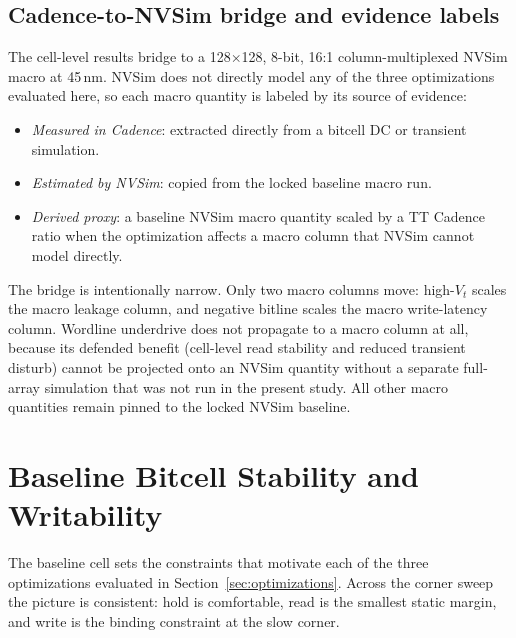 \documentclass[pdflatex,sn-mathphys-num]{sn-jnl}%
\theoremstyle{thmstyleone}%
\theoremstyle{thmstyletwo}%
\theoremstyle{thmstylethree}%
\begin{document}
\subsection{Cadence-to-NVSim bridge and evidence labels}\label{sec:setup-bridge}

The cell-level results bridge to a 128$\times$128, 8-bit, 16:1 column-multiplexed NVSim macro at 45\,nm. NVSim does not directly model any of the three optimizations evaluated here, so each macro quantity is labeled by its source of evidence:

\begin{itemize}
\item \emph{Measured in Cadence}: extracted directly from a bitcell DC or transient simulation.
\item \emph{Estimated by NVSim}: copied from the locked baseline macro run.
\item \emph{Derived proxy}: a baseline NVSim macro quantity scaled by a TT Cadence ratio when the optimization affects a macro column that NVSim cannot model directly.
\end{itemize}

The bridge is intentionally narrow. Only two macro columns move: high-$V_t$ scales the macro leakage column, and negative bitline scales the macro write-latency column. Wordline underdrive does not propagate to a macro column at all, because its defended benefit (cell-level read stability and reduced transient disturb) cannot be projected onto an NVSim quantity without a separate full-array simulation that was not run in the present study. All other macro quantities remain pinned to the locked NVSim baseline.

\section{Baseline Bitcell Stability and Writability}\label{sec:baseline-bitcell}

The baseline cell sets the constraints that motivate each of the three optimizations evaluated in Section~\ref{sec:optimizations}. Across the corner sweep the picture is consistent: hold is comfortable, read is the smallest static margin, and write is the binding constraint at the slow corner.
\end{document}
